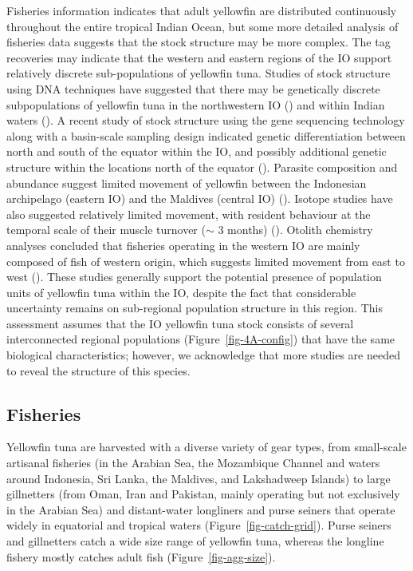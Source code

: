\documentclass[
]{scrartcl}
\begin{document}
Fisheries information indicates that adult yellowfin are distributed
continuously throughout the entire tropical Indian Ocean, but some more
detailed analysis of fisheries data suggests that the stock structure
may be more complex. The tag recoveries may indicate that the western
and eastern regions of the IO support relatively discrete
sub-populations of yellowfin tuna. Studies of stock structure using DNA
techniques have suggested that there may be genetically discrete
subpopulations of yellowfin tuna in the northwestern IO
() and within Indian waters
(). A
recent study of stock structure using the gene sequencing technology
along with a basin-scale sampling design indicated genetic
differentiation between north and south of the equator within the IO,
and possibly additional genetic structure within the locations north of
the equator (). Parasite composition and abundance suggest limited
movement of yellowfin between the Indonesian archipelago (eastern IO)
and the Maldives (central IO)
().
Isotope studies have also suggested relatively limited movement, with
resident behaviour at the temporal scale of their muscle turnover
(\(\sim\) 3 months)
().
Otolith chemistry analyses concluded that fisheries operating in the
western IO are mainly composed of fish of western origin, which suggests
limited movement from east to west
(). These studies generally support the potential
presence of population units of yellowfin tuna within the IO, despite
the fact that considerable uncertainty remains on sub-regional
population structure in this region. This assessment assumes that the IO
yellowfin tuna stock consists of several interconnected regional
populations (Figure~\ref{fig-4A-config}) that have the same biological
characteristics; however, we acknowledge that more studies are needed to
reveal the structure of this species.

\subsection{Fisheries}\label{fisheries}

Yellowfin tuna are harvested with a diverse variety of gear types, from
small-scale artisanal fisheries (in the Arabian Sea, the Mozambique
Channel and waters around Indonesia, Sri Lanka, the Maldives, and
Lakshadweep Islands) to large gillnetters (from Oman, Iran and Pakistan,
mainly operating but not exclusively in the Arabian Sea) and
distant-water longliners and purse seiners that operate widely in
equatorial and tropical waters (Figure~\ref{fig-catch-grid}). Purse
seiners and gillnetters catch a wide size range of yellowfin tuna,
whereas the longline fishery mostly catches adult fish
(Figure~\ref{fig-agg-size}).
\end{document}
